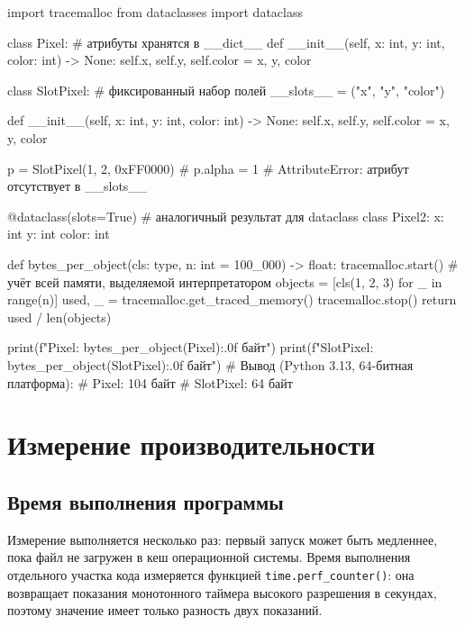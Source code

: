 \documentclass[11pt,a4paper]{article}
\newcommand{\code}[1]{\texttt{#1}}
\begin{document}
\begin{py}
import tracemalloc
from dataclasses import dataclass


class Pixel:                    # атрибуты хранятся в __dict__
    def __init__(self, x: int, y: int, color: int) -> None:
        self.x, self.y, self.color = x, y, color


class SlotPixel:                # фиксированный набор полей
    __slots__ = ("x", "y", "color")

    def __init__(self, x: int, y: int, color: int) -> None:
        self.x, self.y, self.color = x, y, color


p = SlotPixel(1, 2, 0xFF0000)
# p.alpha = 1    # AttributeError: атрибут отсутствует в __slots__


@dataclass(slots=True)          # аналогичный результат для dataclass
class Pixel2:
    x: int
    y: int
    color: int


def bytes_per_object(cls: type, n: int = 100_000) -> float:
    tracemalloc.start()         # учёт всей памяти, выделяемой интерпретатором
    objects = [cls(1, 2, 3) for _ in range(n)]
    used, _ = tracemalloc.get_traced_memory()
    tracemalloc.stop()
    return used / len(objects)


print(f"Pixel:     {bytes_per_object(Pixel):.0f} байт")
print(f"SlotPixel: {bytes_per_object(SlotPixel):.0f} байт")
# Вывод (Python 3.13, 64-битная платформа):
# Pixel:     104 байт
# SlotPixel: 64 байт
\end{py}

\section{Измерение производительности}

\subsection{Время выполнения программы}


Измерение выполняется несколько раз: первый запуск может быть медленнее, пока файл не загружен
в кеш операционной системы. Время выполнения отдельного участка кода измеряется функцией
\code{time.perf\_counter()}: она возвращает показания монотонного таймера высокого разрешения
в секундах, поэтому значение имеет только разность двух показаний.
\end{document}
